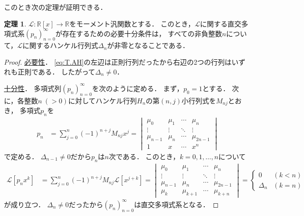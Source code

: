 \documentclass{jlreq}
\theoremstyle{definition}
\newtheorem{theorem}{定理}
\newcommand{\functype}[3]{#1\colon#2\longrightarrow#3}
\newcommand{\mcL}{\mathcal{L}}
\newcommand{\polynoms}[2]{#1[#2]}
\newcommand{\realnums}{\mathbb{R}}
\newcommand{\sequence}[3]{\sequenceparen{#1}{#2}{#3}{(}{)}} %
\newcommand{\sequenceparen}[5]{{#4#1#5}_{#2}^{#3}}
\begin{document}
このとき次の定理が証明できる．

\begin{theorem}
  \(\functype{\mcL}{\polynoms{\realnums}{x}}{\realnums}\)をモーメント汎関数とする．
  このとき，\(\mcL\)に関する直交多項式系\(\sequence{p_n}{n=0}{\infty}\)が存在するための必要十分条件は，
  すべての非負整数\(n\)について，\(\mcL\)に関するハンケル行列式\(\Delta_n\)が非零となることである\cite[p. 11, Theorem 3.1]{Chihara2011}．
\end{theorem}
\begin{proof}
  \underline{必要性}．
  \cref{eq:T.AH}の左辺は正則行列だったから右辺の2つの行列はいずれも正則である．
  したがって\(\Delta_n\neq0\)．

  \underline{十分性}．
  多項式列\(\sequence{p_n}{n=0}{\infty}\)を次のように定める．
  まず，\(p_0=1\)とする．
  次に，各整数\(n\:(>0)\)に対してハンケル行列\(H_n\)の第\((n,j)\)小行列式を\(M_{nj}\)とおき，
  多項式\(p_n\)を
  \begin{align}
    p_n &= \sum_{j=0}^n (-1)^{n+j} M_{nj} x^j
    =
    \begin{vmatrix}
      \mu_0 & \mu_1 & \cdots & \mu_n \\
      \vdots & \vdots & \ddots & \vdots \\
      \mu_{n-1} & \mu_n & \cdots & \mu_{2n-1} \\
      1 & x & \cdots & x^n
    \end{vmatrix}
  \end{align}
  で定める．
  \(\Delta_{n-1}\neq0\)だから\(p_n\)は\(n\)次である．
  このとき，\(k=0,1,\dots,n\)について
  \begin{align}
    \mcL[p_n x^k]
    &= \sum_{j=0}^n (-1)^{n+j} M_{nj} \mcL[x^{j+k}]
    =
    \begin{vmatrix}
      \mu_0 & \mu_1 & \cdots & \mu_n \\
      \vdots & \vdots & \ddots & \vdots \\
      \mu_{n-1} & \mu_n & \cdots & \mu_{2n-1} \\
      \mu_{k} & \mu_{k+1} & \cdots & \mu_{k+n}
    \end{vmatrix}
    =
    \begin{cases}
      0 & (k<n) \\
      \Delta_n & (k=n)
    \end{cases}
  \end{align}
  が成り立つ．
  \(\Delta_n\neq0\)だったから\(\sequence{p_n}{n=0}{\infty}\)は直交多項式系となる．
\end{proof}

\printbibliography[title={参考文献}]
\end{document}
